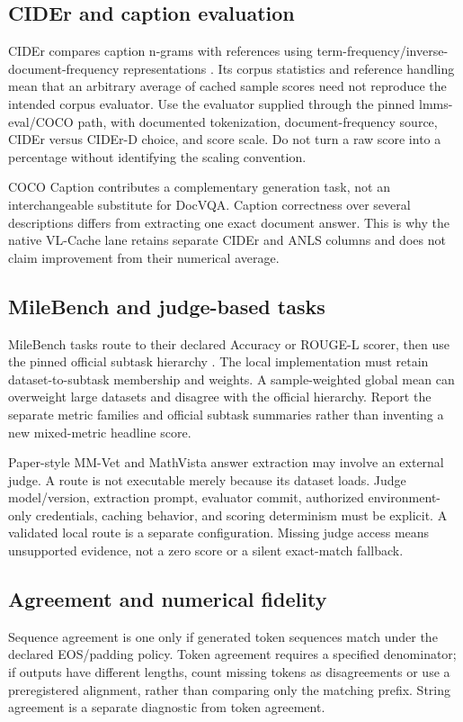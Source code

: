 \subsection{CIDEr and caption evaluation}
CIDEr compares caption n-grams with references using term-frequency/inverse-
document-frequency representations \citep{vedantam2015cider}. Its corpus
statistics and reference handling mean that an arbitrary average of cached
sample scores need not reproduce the intended corpus evaluator. Use the
evaluator supplied through the pinned lmms-eval/COCO path, with documented
tokenization, document-frequency source, CIDEr versus CIDEr-D choice, and
score scale. Do not turn a raw score into a percentage without identifying
the scaling convention.

COCO Caption \citep{lin2014coco} contributes a complementary generation task,
not an interchangeable substitute for DocVQA. Caption correctness over several
descriptions differs from extracting one exact document answer. This is why
the native VL-Cache lane retains separate CIDEr and ANLS columns and does not
claim improvement from their numerical average.

\subsection{MileBench and judge-based tasks}
MileBench tasks route to their declared Accuracy or ROUGE-L scorer, then use
the pinned official subtask hierarchy \citep{song2024milebench}. The local
implementation must retain dataset-to-subtask membership and weights. A
sample-weighted global mean can overweight large datasets and disagree with
the official hierarchy. Report the separate metric families and official
subtask summaries rather than inventing a new mixed-metric headline score.

Paper-style MM-Vet and MathVista \citep{lu2024mathvista} answer extraction may involve an external
judge. A route is not executable merely because its dataset loads. Judge
model/version, extraction prompt, evaluator commit, authorized environment-only
credentials, caching behavior, and scoring determinism must be explicit.
A validated local route is a separate configuration. Missing judge access
means unsupported evidence, not a zero score or a silent exact-match fallback.

\subsection{Agreement and numerical fidelity}
Sequence agreement is one only if generated token sequences match under the
declared EOS/padding policy. Token agreement requires a specified denominator;
if outputs have different lengths, count missing tokens as disagreements or
use a preregistered alignment, rather than comparing only the matching prefix.
String agreement is a separate diagnostic from token agreement.

